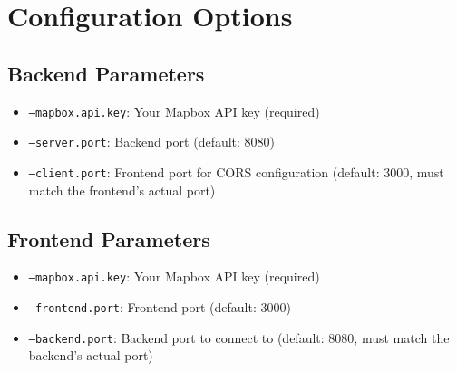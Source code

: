 \section{Configuration Options}

\subsection{Backend Parameters}
\begin{itemize}
    \item \texttt{---mapbox.api.key}: Your Mapbox API key (required)
    \item \texttt{---server.port}: Backend port (default: 8080)
    \item \texttt{---client.port}: Frontend port for CORS configuration (default: 3000, must match the frontend's actual port)
\end{itemize}

\subsection{Frontend Parameters}
\begin{itemize}
    \item \texttt{---mapbox.api.key}: Your Mapbox API key (required)
    \item \texttt{---frontend.port}: Frontend port (default: 3000)
    \item \texttt{---backend.port}: Backend port to connect to (default: 8080, must match the backend's actual port)
\end{itemize}